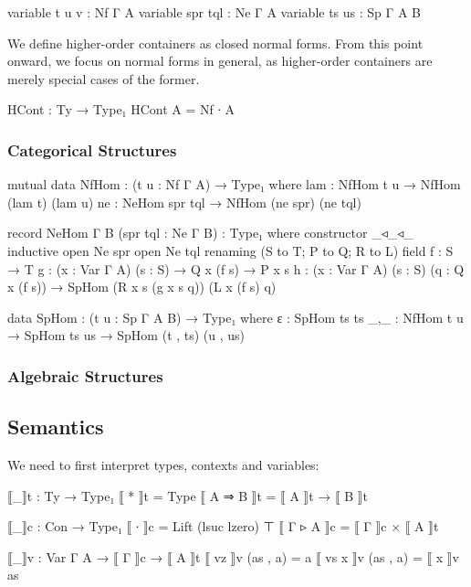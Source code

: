 \begin{code}[hide]
  variable t u v : Nf Γ A
  variable spr tql : Ne Γ A
  variable ts us : Sp Γ A B
\end{code}

We define higher-order containers as closed normal forms. From this point onward, we focus on normal forms in general, as higher-order containers are merely special cases of the former.

\begin{code}
HCont : Ty → Type₁
HCont A = Nf ∙ A
\end{code}

\subsubsection*{Categorical Structures}

\begin{code}
mutual
  data NfHom : (t u : Nf Γ A) → Type₁ where
    lam : NfHom t u → NfHom (lam t) (lam u)
    ne  : NeHom spr tql → NfHom (ne spr) (ne tql)

  record NeHom {Γ} {B} (spr tql : Ne Γ B) : Type₁ where
    constructor _◃_◃_
    inductive
    open Ne spr
    open Ne tql renaming (S to T; P to Q; R to L)
    field
      f : S → T
      g : (x : Var Γ A) (s : S) → Q x (f s) → P x s
      h : (x : Var Γ A) (s : S) (q : Q x (f s))
        → SpHom (R x s (g x s q)) (L x (f s) q)
        
  data SpHom : (t u : Sp Γ A B) → Type₁ where
    ε   : SpHom ts ts
    _,_ : NfHom t u → SpHom ts us → SpHom (t , ts) (u , us)
\end{code}

\subsubsection*{Algebraic Structures}

\begin{code}

\end{code}

\subsection{Semantics}

We need to first interpret types, contexts and variables:

\begin{code}
⟦_⟧t : Ty → Type₁
⟦ * ⟧t = Type
⟦ A ⇒ B ⟧t = ⟦ A ⟧t → ⟦ B ⟧t

⟦_⟧c : Con → Type₁
⟦ ∙ ⟧c = Lift (lsuc lzero) ⊤
⟦ Γ ▹ A ⟧c = ⟦ Γ ⟧c × ⟦ A ⟧t

⟦_⟧v : Var Γ A → ⟦ Γ ⟧c → ⟦ A ⟧t
⟦ vz ⟧v (as , a) = a
⟦ vs x ⟧v (as , a) = ⟦ x ⟧v as
\end{code}

